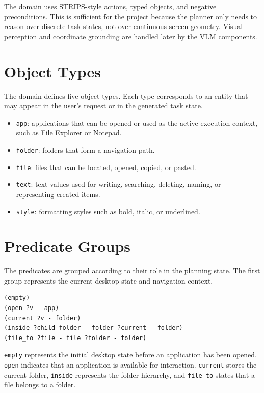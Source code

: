The domain uses STRIPS-style actions, typed objects, and negative preconditions. This is sufficient for the project because the planner only needs to reason over discrete task states, not over continuous screen geometry. Visual perception and coordinate grounding are handled later by the VLM components.

\section{Object Types}

The domain defines five object types. Each type corresponds to an entity that may appear in the user's request or in the generated task state.

\begin{itemize}
    \item \texttt{app}: applications that can be opened or used as the active execution context, such as File Explorer or Notepad.
    \item \texttt{folder}: folders that form a navigation path.
    \item \texttt{file}: files that can be located, opened, copied, or pasted.
    \item \texttt{text}: text values used for writing, searching, deleting, naming, or representing created items.
    \item \texttt{style}: formatting styles such as bold, italic, or underlined.
\end{itemize}

\section{Predicate Groups}

The predicates are grouped according to their role in the planning state. The first group represents the current desktop state and navigation context.

\begin{lstlisting}
(empty)
(open ?v - app)
(current ?v - folder)
(inside ?child_folder - folder ?current - folder)
(file_to ?file - file ?folder - folder)
\end{lstlisting}

\texttt{empty} represents the initial desktop state before an application has been opened. \texttt{open} indicates that an application is available for interaction. \texttt{current} stores the current folder, \texttt{inside} represents the folder hierarchy, and \texttt{file\_to} states that a file belongs to a folder.

